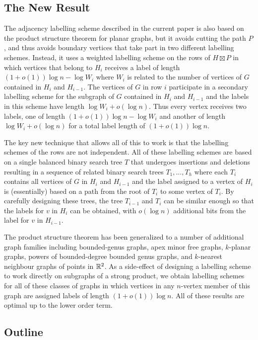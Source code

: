 \documentclass[kpfonts]{patmorin}
\begin{document}
\subsection{The New Result}

The adjacency labelling scheme described in the current paper is also based on the product structure theorem for planar graphs, but it avoids cutting the path $P$, and thus avoids boundary vertices that take part in two different labelling schemes.  Instead, it uses a weighted labelling scheme on the rows of $H\boxtimes P$ in which vertices that belong to $H_i$ receives a label of length $(1+o(1))\log n-\log W_i$ where $W_i$ is related to the number of vertices of $G$ contained in $H_i$ and $H_{i-1}$.  The vertices of $G$ in row $i$ participate in a secondary labelling scheme for the subgraph of $G$ contained in $H_i$ and $H_{i-1}$ and the labels in this scheme have length $\log W_i + o(\log n)$. Thus every vertex receives two labels, one of length $(1+o(1))\log n-\log W_i$ and another of length $\log W_i + o(\log n)$ for a total label length of $(1+o(1))\log n$.  

The key new technique that allows all of this to work is that the labelling schemes of the rows are not independent.  All of these labelling schemes are based on a single balanced binary search tree $T$ that undergoes insertions and deletions resulting in a sequence of related binary search trees $T_1,\ldots,T_h$ where each $T_i$ contains all vertices of $G$ in $H_{i}$ and $H_{i-1}$ and the label assigned to a vertex of $H_i$ is (essentially) based on a path from the root of $T_i$ to some vertex of $T_i$.  By carefully designing these trees, the tree $T_{i-1}$ and $T_{i}$ can be similar enough so that the labels for $v$ in $H_i$ can be obtained, with $o(\log n)$ additional bits from the label for $v$ in $H_{i-1}$.

The product structure theorem has been generalized to a number of additional graph families including bounded-genus graphs, apex minor free graphs, $k$-planar graphs, powers of bounded-degree bounded genus graphs, and $k$-nearest neighbour graphs of points in $\mathbb{R}^2$. As a side-effect of designing a labelling scheme to work directly on subgraphs of a strong product, we obtain labelling schemes for all of these classes of graphs in which vertices in any $n$-vertex member of this graph are assigned labels of length $(1+o(1))\log n$.  All of these results are optimal up to the lower order term.

\subsection{Outline}
\end{document}
